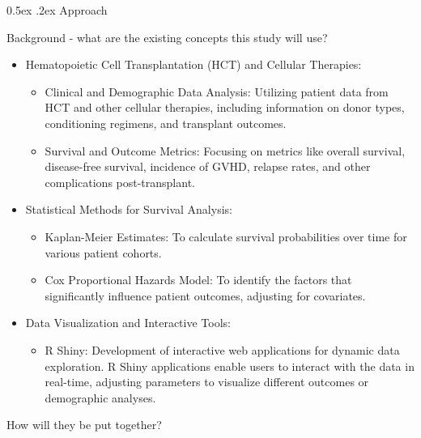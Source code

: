 \documentclass[11pt,]{article}
\makeatletter
\providecommand{\tightlist}{%
  \setlength{\itemsep}{0pt}\setlength{\parskip}{0pt}}
\renewcommand\subsection{
  \@startsection{subsection}{2}{\z@}
    {-1.5ex\@plus -1ex \@minus -.2ex}%
    {0.5ex \@plus .2ex}%
    {\normalfont\normalsize\bf}} %
\makeatother
\begin{document}
\hypertarget{approach}{%
\subsection{Approach}\label{approach}}

Background - what are the existing concepts this study will use?

\begin{itemize}
\item
  Hematopoietic Cell Transplantation (HCT) and Cellular Therapies:

  \begin{itemize}
  \item
    Clinical and Demographic Data Analysis: Utilizing patient data from
    HCT and other cellular therapies, including information on donor
    types, conditioning regimens, and transplant outcomes.
  \item
    Survival and Outcome Metrics: Focusing on metrics like overall
    survival, disease-free survival, incidence of GVHD, relapse rates,
    and other complications post-transplant.
  \end{itemize}
\item
  Statistical Methods for Survival Analysis:

  \begin{itemize}
  \item
    Kaplan-Meier Estimates: To calculate survival probabilities over
    time for various patient cohorts.
  \item
    Cox Proportional Hazards Model: To identify the factors that
    significantly influence patient outcomes, adjusting for covariates.
  \end{itemize}
\item
  Data Visualization and Interactive Tools:

  \begin{itemize}
  \tightlist
  \item
    R Shiny: Development of interactive web applications for dynamic
    data exploration. R Shiny applications enable users to interact with
    the data in real-time, adjusting parameters to visualize different
    outcomes or demographic analyses.
  \end{itemize}
\end{itemize}

How will they be put together?
\end{document}

